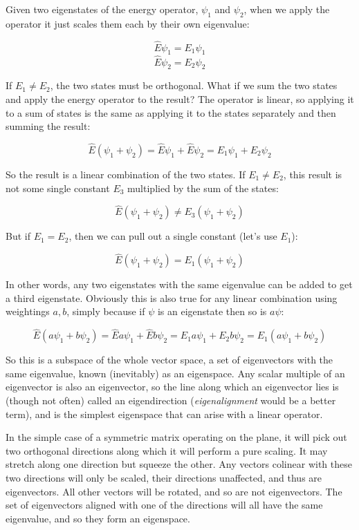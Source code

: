 Given two eigenstates of the energy operator, $\psi_1$ and $\psi_2$, when we apply the operator it just scales them each by their own eigenvalue:

$$\hat{E}\psi_1 = E_1\psi_1$$
$$\hat{E}\psi_2 = E_2\psi_2$$

If $E_1 \ne E_2$, the two states must be orthogonal. What if we sum the two states and apply the energy operator to the result? The operator is linear, so applying it to a sum of states is the same as applying it to the states separately and then summing the result:

$$\hat{E}(\psi_1 + \psi_2) = \hat{E}\psi_1 + \hat{E}\psi_2 = E_1\psi_1 + E_2\psi_2$$

So the result is a linear combination of the two states. If $E_1 \ne E_2$, this result is not   some single constant $E_3$ multiplied by the sum of the states:

$$\hat{E}(\psi_1 + \psi_2) \ne E_3 (\psi_1 + \psi_2)$$

But if $E_1 = E_2$, then we can pull out a single constant (let's use $E_1$):

$$\hat{E}(\psi_1 + \psi_2) = E_1 (\psi_1 + \psi_2)$$

In other words, any two eigenstates with the same eigenvalue can be added to get a third eigenstate. Obviously this is also true for any linear combination using weightings $a, b$, simply because if $\psi$ is an eigenstate then so is $a\psi$:

$$\hat{E}(a\psi_1 + b\psi_2) = \hat{E}a\psi_1 + \hat{E}b\psi_2 = E_1a\psi_1 + E_2b\psi_2 = E_1(a\psi_1 + b\psi_2)$$

So this is a subspace of the whole vector space, a set of eigenvectors with the same eigenvalue, known (inevitably) as an eigenspace. Any scalar multiple of an eigenvector is also an eigenvector, so the line along which an eigenvector lies is (though not often) called an eigendirection (\textit{eigenalignment} would be a better term), and is the simplest eigenspace that can arise with a linear operator.

In the simple case of a symmetric matrix operating on the plane, it will pick out two orthogonal directions along which it will perform a pure scaling. It may stretch along one direction but squeeze the other. Any vectors colinear with these two directions will only be scaled, their directions unaffected, and thus are eigenvectors. All other vectors will be rotated, and so are not eigenvectors. The set of eigenvectors aligned with one of the directions will all have the same eigenvalue, and so they form an eigenspace.

